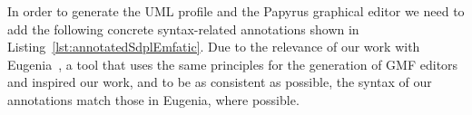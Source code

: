 In order to generate the UML profile and the Papyrus graphical editor we need to add the following concrete syntax-related annotations shown in Listing~\ref{lst:annotatedSdplEmfatic}. Due to the relevance of our work with Eugenia~\cite{kolovos2015eugenia}, a tool that uses the same principles for the generation of GMF editors and inspired our work, and to be as consistent as possible, the syntax of our annotations match those in Eugenia, where possible.

\begin{figure}[ht!]
	
	\vspace*{-5mm}
\end{figure}

